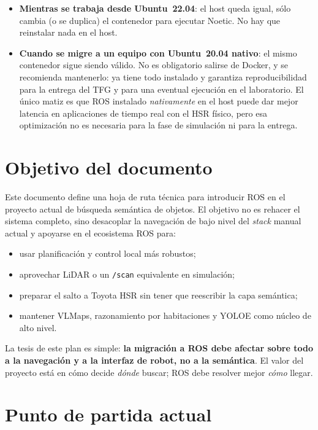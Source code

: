\documentclass[11pt,a4paper]{article}
\begin{document}
\begin{itemize}
  \item \textbf{Mientras se trabaja desde Ubuntu~22.04}: el host queda igual,
        sólo cambia (o se duplica) el contenedor para ejecutar Noetic. No hay
        que reinstalar nada en el host.
  \item \textbf{Cuando se migre a un equipo con Ubuntu~20.04 nativo}:
        el mismo contenedor sigue siendo válido. No es obligatorio salirse de
        Docker, y se recomienda mantenerlo: ya tiene todo instalado y
        garantiza reproducibilidad para la entrega del TFG y para una eventual
        ejecución en el laboratorio. El único matiz es que ROS instalado
        \emph{nativamente} en el host puede dar mejor latencia en aplicaciones
        de tiempo real con el HSR físico, pero esa optimización no es necesaria
        para la fase de simulación ni para la entrega.
\end{itemize}

\section{Objetivo del documento}

Este documento define una hoja de ruta técnica para introducir ROS en el
proyecto actual de búsqueda semántica de objetos. El objetivo no es rehacer el
sistema completo, sino desacoplar la navegación de bajo nivel del \textit{stack}
manual actual y apoyarse en el ecosistema ROS para:

\begin{itemize}
  \item usar planificación y control local más robustos;
  \item aprovechar LiDAR o un \texttt{/scan} equivalente en simulación;
  \item preparar el salto a Toyota HSR sin tener que reescribir la capa
        semántica;
  \item mantener VLMaps, razonamiento por habitaciones y YOLOE como núcleo de
        alto nivel.
\end{itemize}

La tesis de este plan es simple: \textbf{la migración a ROS debe afectar sobre
todo a la navegación y a la interfaz de robot, no a la semántica}. El valor
del proyecto está en cómo decide \emph{dónde} buscar; ROS debe resolver mejor
\emph{cómo} llegar.

\section{Punto de partida actual}
\end{document}
